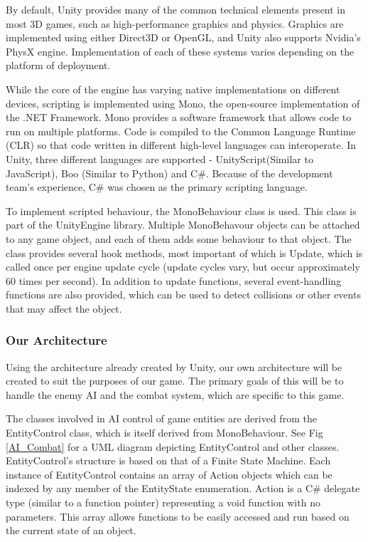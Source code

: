 \documentclass{article}
\begin{document}
By default, Unity provides many of the common technical elements present in most 3D games, such as high-performance graphics and physics.  Graphics are implemented using either Direct3D or OpenGL, and Unity also supports Nvidia's PhysX engine.  Implementation of each of these systems varies depending on the platform of deployment.

While the core of the engine has varying native implementations on different devices, scripting is implemented using Mono, the open-source implementation of the .NET Framework.  Mono provides a software framework that allows code to run on multiple platforms.  Code is compiled to the Common Language Runtime (CLR) so that code written in different high-level languages can interoperate.  In Unity, three different languages are supported - UnityScript(Similar to JavaScript), Boo (Similar to Python) and C\#.  Because of the development team's experience, C\# was chosen as the primary scripting language.

To implement scripted behaviour, the MonoBehaviour class is used.  This class is part of the UnityEngine library.  Multiple MonoBehavour objects can be attached to any game object, and each of them adds some behaviour to that object.  The class provides several hook methods, most important of which is Update, which is called once per engine update cycle (update cycles vary, but occur approximately 60 times per second).  In addition to update functions, several event-handling functions are also provided, which can be used to detect collisions or other  events that may affect the object.

\subsubsection{Our Architecture}

Using the architecture already created by Unity, our own architecture will be created to suit the purposes of our game.  The primary goals of this will be to handle the enemy AI and the combat system, which are specific to this game.

The classes involved in AI control of game entities are derived from the EntityControl class, which is itself derived from MonoBehaviour.  See Fig \ref{AI_Combat} for a UML diagram depicting EntityControl and other classes.  EntityControl's structure is based on that of a Finite State Machine.  Each instance of EntityControl contains an array of Action objects which can be indexed by any member of the EntityState enumeration.  Action is a C\# delegate type (similar to a function pointer) representing a void function with no parameters.  This array allows functions to be easily accessed and run based on the current state of an object.
\end{document}
